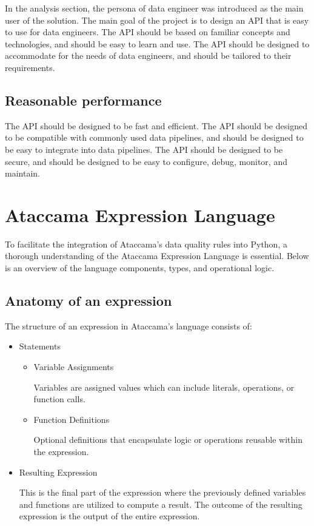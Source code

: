 In the analysis section, the persona of data engineer was introduced as the main user of the solution. The main goal of the project is to design an API that is easy to use for data engineers. The API should be based on familiar concepts and technologies, and should be easy to learn and use. The API should be designed to accommodate for the needs of data engineers, and should be tailored to their requirements.

\subsection{Reasonable performance}

The API should be designed to be fast and efficient. The API should be designed to be compatible with commonly used data pipelines, and should be designed to be easy to integrate into data pipelines. The API should be designed to be secure, and should be designed to be easy to configure, debug, monitor, and maintain.

\section{Ataccama Expression Language}

To facilitate the integration of Ataccama's data quality rules into Python, a thorough understanding of the Ataccama Expression Language is essential. Below is an overview of the language components, types, and operational logic.

\subsection{Anatomy of an expression}

The structure of an expression in Ataccama's language consists of:

\begin{itemize}

    \item Statements
    
        \begin{itemize}
            \item Variable Assignments
            
            Variables are assigned values which can include literals, operations, or function calls.
            \item Function Definitions
            
            Optional definitions that encapsulate logic or operations reusable within the expression.
        \end{itemize}
    \item Resulting Expression
    
    This is the final part of the expression where the previously defined variables and functions are utilized to compute a result. The outcome of the resulting expression is the output of the entire expression.
\end{itemize}


